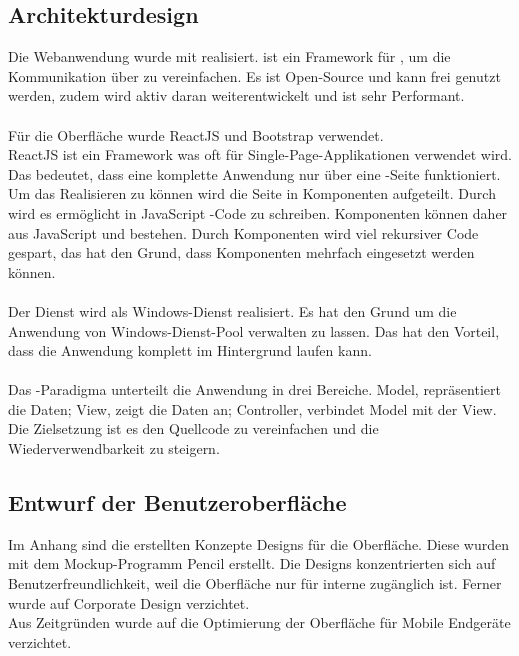 \subsection{Architekturdesign}
\label{sec:Architekturdesign}

Die Webanwendung wurde mit  realisiert.  ist ein Framework für , um die Kommunikation über  zu vereinfachen. Es ist Open-Source und kann frei genutzt werden, zudem wird aktiv daran weiterentwickelt und ist sehr Performant. \\
\\
Für die Oberfläche wurde ReactJS und Bootstrap verwendet. \\
ReactJS ist ein Framework was oft für Single-Page-Applikationen verwendet wird. Das bedeutet, dass eine komplette Anwendung nur über eine -Seite funktioniert. Um das Realisieren zu können wird die Seite in Komponenten aufgeteilt. Durch  wird es ermöglicht in JavaScript -Code zu schreiben. Komponenten können daher aus JavaScript und  bestehen. Durch Komponenten wird viel rekursiver Code gespart, das hat den Grund, dass Komponenten mehrfach eingesetzt werden können. \\
\\
Der Dienst wird als Windows-Dienst realisiert. Es hat den Grund um die Anwendung von Windows-Dienst-Pool verwalten zu lassen. Das hat den Vorteil, dass die Anwendung komplett im Hintergrund laufen kann. \\
\\
Das -Paradigma  unterteilt die Anwendung in drei Bereiche. Model, repräsentiert die Daten; View, zeigt die Daten an; Controller, verbindet Model mit der View. Die Zielsetzung ist es den Quellcode zu vereinfachen und die Wiederverwendbarkeit zu steigern.


\subsection{Entwurf der Benutzeroberfläche}
\label{sec:Benutzeroberflaeche} 

Im Anhang sind die erstellten Konzepte Designs für die Oberfläche. Diese wurden mit dem Mockup-Programm Pencil erstellt. Die Designs konzentrierten sich auf Benutzerfreundlichkeit, weil die Oberfläche nur für interne zugänglich ist. Ferner wurde auf Corporate Design verzichtet.\\
Aus Zeitgründen wurde auf die Optimierung der Oberfläche für Mobile Endgeräte verzichtet. 

